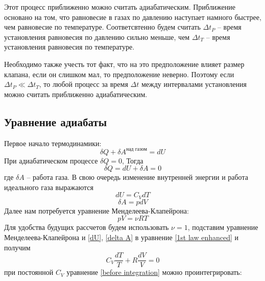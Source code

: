 \documentclass[a4paper,12pt]{article}
\begin{document}
        Этот процесс приближенно можно считать адиабатическим. Приближение основано на том, что равновесие в газах по давлению наступает намного быстрее, чем равновесие по температуре. Соответсвтенно будем считать $\Delta t_P$ -- время установления равновесия по давлению сильно меньше, чем $\Delta t_T$ -- время установления равновесия по температуре.

        Необходимо также учесть тот факт, что на это предположение влияет размер клапана, если он слишком мал, то предположение неверно. Поэтому если $\Delta t_P \ll \Delta t_T$, то любой процесс за время $\Delta t$ между интервалами установления можно считать приближенно адиабатическим.

    \subsection*{Уравнение адиабаты}
        Первое начало термодинамики:
        \begin{equation}
            \label{1st law thermodynamics}
            \delta Q + \delta A^{\text{над газом}}=dU
        \end{equation}
        При адиабатическом процессе $\delta Q = 0$, Тогда 
        \begin{equation}
            \label{1st law enhanced}
            \delta Q = dU+\delta A = 0
        \end{equation}
        где $\delta A$ -- работа газа. В свою очередь изменение внутренней энергии и работа идеального газа выражаются
        \begin{equation}
            dU=C_VdT
            \label{dU}
        \end{equation}
        \begin{equation}
            \delta A=pdV
            \label{delta A}
        \end{equation}
        Далее нам потребуется уравнение Менделеева-Клапейрона:
        \begin{equation}
            pV=\nu RT
            \label{pV}
        \end{equation}
        Для удобства будущих рассчетов будем использовать $\nu = 1$, подставим уравнение Менделеева-Клапейрона и \eqref{dU}, \eqref{delta A} в уравнение \eqref{1st law enhanced} и получим
        \begin{equation}
            C_V\frac{dT}{T}+R\frac{dV}{V}=0
            \label{before integration}
        \end{equation}
        при постоянной $C_V$ уравнение \eqref{before integration} можно проинтегрировать:
\end{document}
